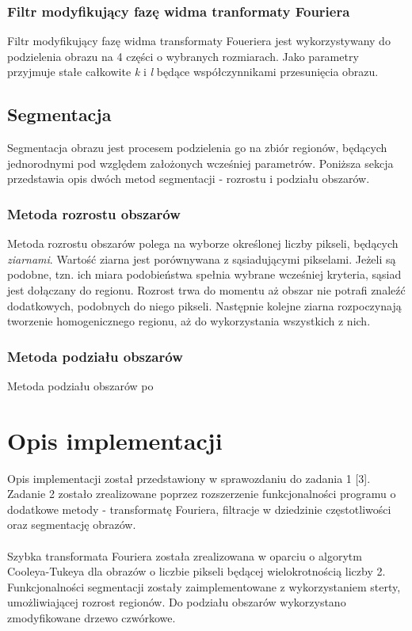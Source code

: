 \documentclass{classrep}
\begin{document}
\subsubsection{Filtr modyfikujący fazę widma tranformaty Fouriera}
Filtr modyfikujący fazę widma transformaty Foueriera jest wykorzystywany do podzielenia obrazu na 4 części o wybranych rozmiarach. Jako parametry przyjmuje stałe całkowite \textit{k} i \textit{l} będące współczynnikami przesunięcia obrazu.

\subsection{Segmentacja}
Segmentacja obrazu jest procesem podzielenia go na zbiór regionów, będących jednorodnymi pod względem założonych wcześniej parametrów. Poniższa sekcja przedstawia opis dwóch metod segmentacji - rozrostu i podziału obszarów.

\subsubsection{Metoda rozrostu obszarów}
Metoda rozrostu obszarów polega na wyborze określonej liczby pikseli, będących \textit{ziarnami}. Wartość ziarna jest porównywana z sąsiadującymi pikselami. Jeżeli są podobne, tzn. ich miara podobieństwa spełnia wybrane wcześniej kryteria, sąsiad jest dołączany do regionu. Rozrost trwa do momentu aż obszar nie potrafi znaleźć dodatkowych, podobnych do niego pikseli. Następnie kolejne ziarna rozpoczynają tworzenie homogenicznego regionu, aż do wykorzystania wszystkich z nich. 

\subsubsection{Metoda podziału obszarów}
Metoda podziału obszarów po

\section{Opis implementacji}
Opis implementacji został przedstawiony w sprawozdaniu do zadania 1 [3]. Zadanie 2 zostało zrealizowane poprzez rozszerzenie funkcjonalności programu o dodatkowe metody - transformatę Fouriera, filtracje w dziedzinie częstotliwości oraz segmentację obrazów.\\
\\
\indent
Szybka transformata Fouriera została zrealizowana w oparciu o algorytm Cooleya-Tukeya dla obrazów o liczbie pikseli będącej wielokrotnością liczby 2. Funkcjonalności segmentacji zostały zaimplementowane z wykorzystaniem sterty, umożliwiającej rozrost regionów. Do podziału obszarów wykorzystano zmodyfikowane drzewo czwórkowe.
\end{document}

